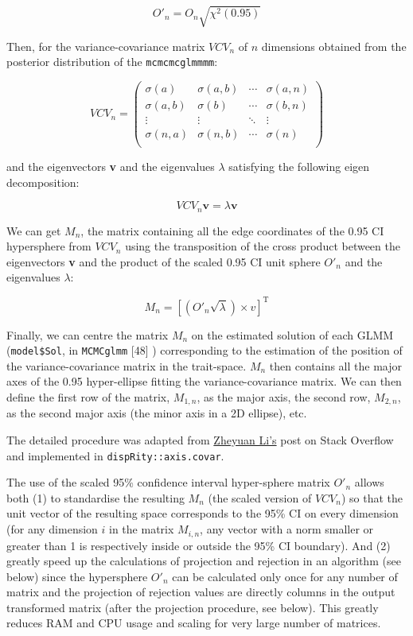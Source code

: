 \documentclass[12pt,a4paper]{article}
\begin{document}
$$O'_{n} = O_{n} \sqrt{\chi^2(0.95)}$$

Then, for the variance-covariance matrix $VCV_{n}$ of $n$ dimensions obtained from the posterior distribution of the \texttt{mcmcmcglmmmm}:

\begin{equation}
VCV_{n} = 
    \begin{pmatrix}
        \sigma(a) & \sigma(a,b) & \cdots & \sigma(a,n) \\
        \sigma(a,b) & \sigma(b) & \cdots & \sigma(b,n) \\
        \vdots  & \vdots  & \ddots & \vdots  \\
        \sigma(n,a) & \sigma(n,b) & \cdots & \sigma(n) \\
    \end{pmatrix}
\end{equation}

and the eigenvectors \textbf{v} and the eigenvalues $\lambda$ satisfying the following eigen decomposition:

$$VCV_{n} \textbf{v} = \lambda \textbf{v}$$

We can get $M_{n}$, the matrix containing all the edge coordinates of the 0.95 CI hypersphere from $VCV_{n}$ using the transposition of the cross product between the eigenvectors \textbf{v} and the product of the scaled 0.95 CI unit sphere $O'_{n}$ and the eigenvalues $\lambda$:

$$M_{n} = [(O'_{n}\sqrt{\lambda}) \times v]^{\text{T}}$$

Finally, we can centre the matrix $M_{n}$ on the estimated solution of each GLMM (\texttt{model\$Sol}, in \texttt{MCMCglmm} [48]%
) corresponding to the estimation of the position of the variance-covariance matrix in the trait-space.
$M_{n}$ then contains all the major axes of the 0.95 hyper-ellipse fitting the variance-covariance matrix.
We can then define the first row of the matrix, $M_{1,n}$, as the major axis, the second row, $M_{2,n}$, as the second major axis (the minor axis in a 2D ellipse), etc.

The detailed procedure was adapted from \href{https://stackoverflow.com/questions/40300217/obtain-vertices-of-the-ellipse-on-an-ellipse-covariance-plot-created-by-care/40316331#40316331}{Zheyuan Li's} post on Stack Overflow and implemented in \texttt{dispRity::axis.covar}.

The use of the scaled 95\% confidence interval hyper-sphere matrix $O'_{n}$ allows both (1) to standardise the resulting $M_{n}$ (the scaled version of $VCV_{n}$) so that the unit vector of the resulting space corresponds to the 95\% CI on every dimension (for any dimension $i$ in the matrix $M_{i,n}$, any vector with a norm smaller or greater than 1 is respectively inside or outside the 95\% CI boundary).
And (2) greatly speed up the calculations of projection and rejection in an algorithm (see below) since the hypersphere $O'_{n}$ can be calculated only once for any number of matrix and the projection of rejection values are directly columns in the output transformed matrix (after the projection procedure, see below).
This greatly reduces RAM and CPU usage and scaling for very large number of matrices.
\end{document}
